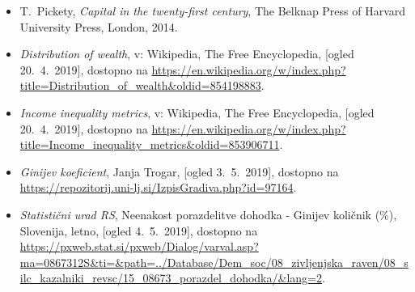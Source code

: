 \documentclass[a4paper,12 pt]{article}
\begin{document}
\begin{itemize}
\item
\label{Pickety}
T.~Pickety, \emph{Capital in the twenty-first century}, The Belknap Press of Harvard University Press, London, 2014.

\item 
\label{Razdelitev premoženja}
\emph{Distribution of wealth}, v: Wikipedia, The Free Encyclopedia, [ogled 20.~4.~2019], dostopno na \url{https://en.wikipedia.org/w/index.php?title=Distribution_of_wealth&oldid=854198883}.

\item 
\label{Metrike ekonomske neenakosti}
\emph{Income inequality metrics}, v: Wikipedia, The Free Encyclopedia, [ogled 20.~4.~2019], dostopno na \url{https://en.wikipedia.org/w/index.php?title=Income_inequality_metrics&oldid=853906711}.

\item
\emph{Ginijev koeficient}, Janja Trogar, [ogled 3.~5.~2019], dostopno na \url{https://repozitorij.uni-lj.si/IzpisGradiva.php?id=97164}.

\item
\emph{Statistični urad RS}, Neenakost porazdelitve dohodka - Ginijev količnik (\%), Slovenija, letno, [ogled 4.~5.~2019], dostopno na \url{https://pxweb.stat.si/pxweb/Dialog/varval.asp?ma=0867312S&ti=&path=../Database/Dem_soc/08_zivljenjska_raven/08_silc_kazalniki_revsc/15_08673_porazdel_dohodka/&lang=2}.
\end{itemize}
\end{document}
